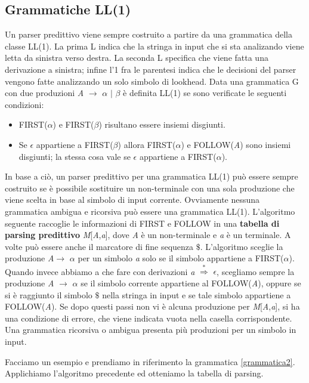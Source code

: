 \subsection{Grammatiche LL(1)}
Un parser predittivo viene sempre costruito a partire da una grammatica della classe LL(1). La prima L \cite{libro: compilatori} indica che la stringa in input che si sta analizando viene letta da sinistra verso destra. La seconda L specifica che viene fatta una derivazione a sinistra; infine l'1 fra le parentesi indica che le decisioni del parser vengono fatte analizzando un solo simbolo di lookhead. Data una grammatica G con due produzioni \textit{A} $\to$ $\alpha$ $\mid$ $\beta$ è definita LL(1) se sono verificate le seguenti condizioni:
\begin{itemize}
	\item FIRST($\alpha$) e FIRST($\beta$) risultano essere insiemi disgiunti.
	\item Se $\epsilon$ appartiene a FIRST($\beta$) allora FIRST($\alpha$) e FOLLOW(\textit{A}) sono insiemi disgiunti; la stessa cosa vale se $\epsilon$ appartiene a FIRST($\alpha$).
\end{itemize}
In base a ciò, un parser predittivo per una grammatica LL(1) può essere sempre costruito se è possibile sostituire un non-terminale con una sola produzione che viene scelta in base al simbolo di input corrente. Ovviamente nessuna grammatica ambigua e ricorsiva può essere una grammatica LL(1). L'algoritmo seguente raccoglie le informazioni di FIRST e FOLLOW in una \textbf{tabella di parsing predittivo} \textit{M}[\textit{A},\textit{a}], dove \textit{A} è un non-terminale e \textit{a} è un terminale. A volte può essere anche il marcatore di fine sequenza $\$$. L'algoritmo sceglie la produzione \textit{A}$\to$ $\alpha$ per un simbolo \textit{a} solo se il simbolo appartiene a FIRST($\alpha$). Quando invece abbiamo a che fare con derivazioni \textit{a} $\overset{*}{\Rightarrow}$ $\epsilon$, scegliamo sempre la produzione \textit{A} $\to$ $\alpha$ se il simbolo corrente appartiene al FOLLOW(\textit{A}), oppure se si è raggiunto il simbolo $\$$ nella stringa in input e se tale simbolo appartiene a FOLLOW(\textit{A}). Se dopo questi passi non vi è alcuna produzione per \textit{M}[\textit{A},\textit{a}], si ha una condizione di errore, che viene indicata vuota nella casella corrispondente. Una grammatica ricorsiva o ambigua presenta più produzioni per un simbolo in input.\par 
\noindent Facciamo un esempio e prendiamo in riferimento la grammatica \ref{grammatica2}. Applichiamo l'algoritmo precedente ed otteniamo la tabella di parsing.\par
